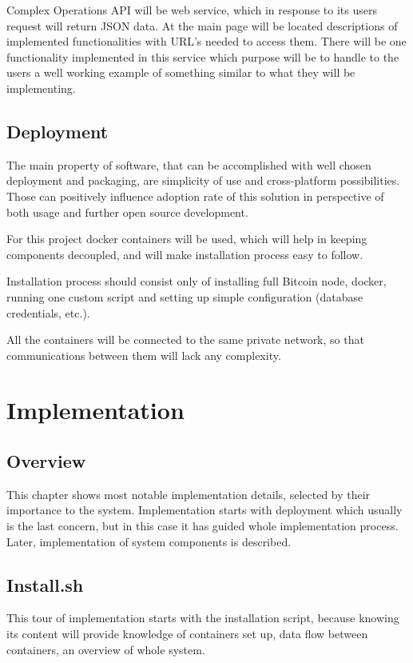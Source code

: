 \documentclass[12pt, en, eng, oneside, final]{mgr}
\begin{document}
Complex Operations API will be web service, which in response to its users request will return JSON data. At the main page will be located descriptions of implemented functionalities with URL's needed to access them. There will be one functionality implemented in this service which purpose will be to handle to the users a well working example of something similar to what they will be implementing.   

\section{Deployment}

The main property of software, that can be accomplished with well chosen deployment and packaging, are simplicity of use and cross-platform possibilities. Those can positively influence adoption rate of this solution in perspective of both usage and further open source development.

For this project docker\cite{docker} containers will be used, which will help in keeping components decoupled, and will make installation process easy to follow. 

Installation process should consist only of installing full Bitcoin node, docker, running one custom script and setting up simple configuration (database credentials, etc.).

All the containers will be connected to the same private network, so that communications between them will lack any complexity.

\chapter{Implementation}

\section{Overview}
This chapter shows most notable implementation details, selected by their importance to the system. Implementation starts with deployment which usually is the last concern, but in this case it has guided whole implementation process. Later, implementation of system components is described.

\section{Install.sh}
This tour of implementation starts with the installation script, because knowing its content will provide knowledge of containers set up, data flow between containers, an overview of whole system.
\end{document}
